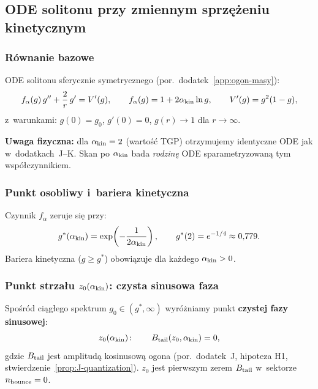 \subsection{ODE solitonu przy zmiennym sprzężeniu kinetycznym}
\label{app:L-ode}

\subsubsection{Równanie bazowe}

ODE solitonu sferycznie symetrycznego (por.\ dodatek~\ref{app:ogon-masy}):
\begin{equation}\label{eq:L-ode}
  f_\alpha(g)\,g'' + \frac{2}{r}\,g' = V'(g),
  \qquad
  f_\alpha(g) = 1 + 2\alpha_{\rm kin}\ln g,
  \qquad
  V'(g) = g^2(1-g),
\end{equation}
z~warunkami: $g(0) = g_0$, $g'(0) = 0$, $g(r)\to 1$ dla $r\to\infty$.

\textbf{Uwaga fizyczna:} dla $\alpha_{\rm kin} = 2$ (wartość TGP)
otrzymujemy identyczne ODE jak w~dodatkach~J--K. Skan po $\alpha_{\rm kin}$
bada \emph{rodzinę} ODE sparametryzowaną tym współczynnikiem.

\subsubsection{Punkt osobliwy i~bariera kinetyczna}

Czynnik $f_\alpha$ zeruje się przy:
\begin{equation}\label{eq:L-gstar}
  g^*(\alpha_{\rm kin}) = \exp\!\left(-\frac{1}{2\alpha_{\rm kin}}\right),
  \qquad
  g^*(2) = e^{-1/4} \approx 0{,}779.
\end{equation}
Bariera kinetyczna ($g \geq g^*$) obowiązuje dla każdego $\alpha_{\rm kin} > 0$.

\subsubsection{Punkt strzału $z_0(\alpha_{\rm kin})$: czysta sinusowa faza}

Spośród ciągłego spektrum $g_0 \in (g^*, \infty)$ wyróżniamy punkt
\textbf{czystej fazy sinusowej}:
\begin{equation}\label{eq:L-z0-def}
  z_0(\alpha_{\rm kin})\colon\qquad B_{\rm tail}(z_0, \alpha_{\rm kin}) = 0,
\end{equation}
gdzie $B_{\rm tail}$ jest amplitudą kosinusową ogona (por.\ dodatek~J,
hipoteza H1, stwierdzenie~\ref{prop:J-quantization}).
$z_0$ jest pierwszym zerem $B_{\rm tail}$ w~sektorze $n_{\rm bounce}=0$.

